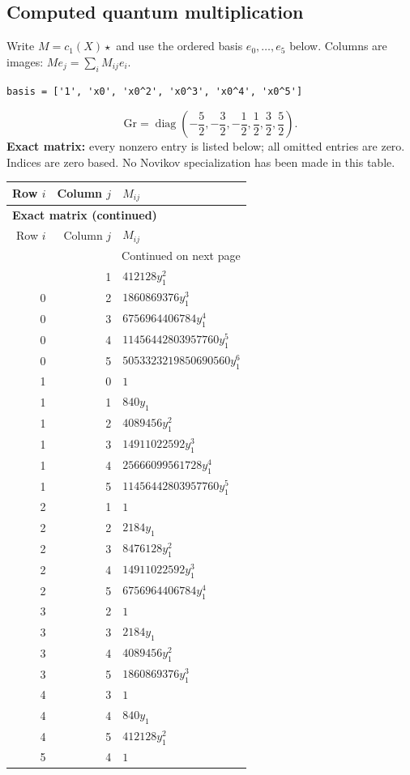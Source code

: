 \documentclass[10pt,a4paper]{article}
\begin{document}
\subsection*{Computed quantum multiplication}
Write $M=c_1(X)\star$ and use the ordered basis $e_0,\ldots,e_{5}$ below. Columns are images: $M e_j=\sum_i M_{ij}e_i$.
\begin{lstlisting}
basis = ['1', 'x0', 'x0^2', 'x0^3', 'x0^4', 'x0^5']
\end{lstlisting}
\[\mathrm{Gr}=\operatorname{diag}\!\left(- \frac{5}{2},- \frac{3}{2},- \frac{1}{2},\frac{1}{2},\frac{3}{2},\frac{5}{2}\right).\]
\textbf{Exact matrix:} every nonzero entry is listed below; all omitted entries are zero. Indices are zero based. No Novikov specialization has been made in this table.
{\small\setlength{\tabcolsep}{7pt}\begin{longtable}{rrp{125mm}}
\toprule Row $i$ & Column $j$ & $M_{ij}$\\\midrule\endfirsthead
\multicolumn{3}{l}{\textbf{Exact matrix (continued)}}\\
\toprule Row $i$ & Column $j$ & $M_{ij}$\\\midrule\endhead
\midrule\multicolumn{3}{r}{Continued on next page}\\\endfoot\bottomrule\endlastfoot
0 & 1 & $412128 y_{1}^{2}$\\
0 & 2 & $1860869376 y_{1}^{3}$\\
0 & 3 & $6756964406784 y_{1}^{4}$\\
0 & 4 & $11456442803957760 y_{1}^{5}$\\
0 & 5 & $5053323219850690560 y_{1}^{6}$\\
1 & 0 & $1$\\
1 & 1 & $840 y_{1}$\\
1 & 2 & $4089456 y_{1}^{2}$\\
1 & 3 & $14911022592 y_{1}^{3}$\\
1 & 4 & $25666099561728 y_{1}^{4}$\\
1 & 5 & $11456442803957760 y_{1}^{5}$\\
2 & 1 & $1$\\
2 & 2 & $2184 y_{1}$\\
2 & 3 & $8476128 y_{1}^{2}$\\
2 & 4 & $14911022592 y_{1}^{3}$\\
2 & 5 & $6756964406784 y_{1}^{4}$\\
3 & 2 & $1$\\
3 & 3 & $2184 y_{1}$\\
3 & 4 & $4089456 y_{1}^{2}$\\
3 & 5 & $1860869376 y_{1}^{3}$\\
4 & 3 & $1$\\
4 & 4 & $840 y_{1}$\\
4 & 5 & $412128 y_{1}^{2}$\\
5 & 4 & $1$\\
\end{longtable}}
\end{document}
